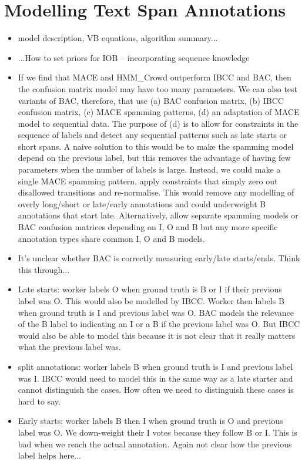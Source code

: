 \section{Modelling Text Span Annotations}\label{sec:model}

\begin{itemize}
\item model description, VB equations, algorithm summary...
\item ...How to set priors for IOB – incorporating sequence knowledge
\item If we find that MACE and HMM_Crowd outperform IBCC and BAC, then the 
confusion matrix model may have too many parameters. We can also test variants of BAC, therefore, that use (a) BAC confusion matrix, (b) IBCC confusion matrix, (c) MACE spamming patterns, (d) an adaptation of MACE model to sequential data. The purpose
of (d) is to allow for constraints in the sequence of labels and detect any sequential patterns such as late starts or short spans. A naive solution to this would be to make the spamming model depend on the previous label, but this removes the advantage of having few parameters when the number of labels is large. Instead, we could make a single MACE spamming pattern, apply constraints that simply zero out disallowed transitions and re-normalise. This would remove any modelling of overly long/short or late/early annotations and could underweight B annotations that start late.   Alternatively, allow separate spamming models or BAC confusion matrices depending on I, O and B but any more specific annotation types share common I, O and B models.
\item It's unclear whether BAC is correctly measuring early/late starts/ends. Think this through...
\item Late starts: worker labels O when ground truth is B or I if their previous label was O. This would also be modelled by IBCC.  Worker then labels B when ground truth is I and previous label was O. BAC models the relevance of the B label to indicating an I or a B if the previous label was O. But IBCC would also be able to model this because it is not clear that it really matters what the previous label was. 
\item split annotations: worker labels B when ground truth is I and previous label was I. IBCC would need to model this in the same way as a late starter and cannot distinguish the cases. How often we need to distinguish these cases is hard to say.
\item Early starts: worker labels B then I when ground truth is O and previous label was  O. We down-weight their I votes because they follow B or I. This is bad when we reach the actual annotation. Again not clear how the previous label helps here...

\end{itemize}
